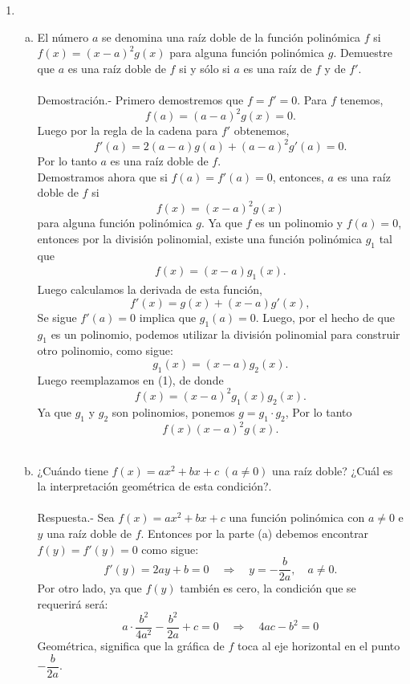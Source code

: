 \begin{enumerate}[\bfseries 1.]
\begin{enumerate}[(a)]
	 \end{enumerate}

     \item 
	 \begin{enumerate}[(a)]

	     \item El número $a$ se denomina una raíz doble de la función polinómica $f$ si $f(x)=(x-a)^2g(x)$ para alguna función polinómica $g$. Demuestre que $a$ es una raíz doble de $f$ si y sólo si $a$ es una raíz de $f$ y de $f'$.\\\\
		 Demostración.-\; Primero demostremos que $f=f'=0$. Para $f$ tenemos,
		 $$f(a)=(a-a)^2g(x)=0.$$
		 Luego por la regla de la cadena para $f'$ obtenemos,
		 $$f'(a)=2(a-a)g(a)+(a-a)^2g'(a)=0.$$
		 Por lo tanto $a$ es una raíz doble de $f$.\\

		 Demostramos ahora que si $f(a)=f'(a)=0$, entonces, $a$ es una raíz doble de $f$ si 
		 $$f(x)=(x-a)^2g(x)$$ 
		 para alguna función polinómica $g$. Ya que $f$ es un polinomio y $f(a)=0$, entonces por la división polinomial, existe una función polinómica $g_1$ tal que 
		 \begin{align} \tag{1}
		 f(x)=(x-a)g_1(x).
		 \end{align}
		 Luego calculamos la derivada de esta función,
		 $$f'(x)=g(x)+(x-a)g'(x),$$
		 Se sigue $f'(a)=0$ implica que $g_1(a)=0.$ Luego, por el hecho de que $g_1$ es un polinomio, podemos utilizar la división polinomial para construir otro polinomio, como sigue:
		 $$g_1(x)=(x-a)g_2(x).$$
		 Luego reemplazamos en (1), de donde
		 $$f(x)=(x-a)^2g_1(x)g_2(x).$$
		 Ya que $g_1$ y $g_2$ son polinomios, ponemos  $g=g_1\cdot g_2$, Por lo tanto
		 $$f(x)(x-a)^2g(x).$$\\

	     \item ¿Cuándo tiene $f(x)=ax^2+bx+c\; (a\neq 0)$ una raíz doble? ¿Cuál es la interpretación geométrica de esta condición?.\\\\
		 Respuesta.-\; Sea $f(x)=ax^2+bx+c$ una función polinómica con $a\neq 0$ e $y$ una raíz doble de $f$. Entonces por la parte (a) debemos encontrar $f(y)=f'(y)=0$ como sigue:
		 $$f'(y)=2ay+b=0 \quad \Rightarrow \quad y=-\dfrac{b}{2a},\quad a\neq 0.$$
		 Por otro lado, ya que $f(y)$ también es cero, la condición que se requerirá será:
		 $$a\cdot \dfrac{b^2}{4a^2}-\dfrac{b^2}{2a}+c=0 \quad \Rightarrow \quad 4ac-b^2=0$$
		 Geométrica, significa que la gráfica de $f$ toca al eje horizontal en el punto $-\dfrac{b}{2a}.$\\\\


\end{enumerate}
\end{enumerate}
